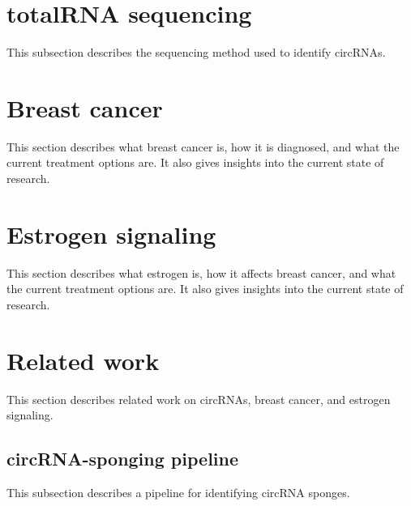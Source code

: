\section{totalRNA sequencing}
This subsection describes the sequencing method used to identify circRNAs.

\lipsum[2]

\section{Breast cancer}
This section describes what breast cancer is, how it is diagnosed, and what the current treatment options are.
It also gives insights into the current state of research.

\lipsum[3]

\section{Estrogen signaling}
This section describes what estrogen is, how it affects breast cancer, and what the current treatment options are.
It also gives insights into the current state of research.

\lipsum[4]

\section{Related work}
This section describes related work on circRNAs, breast cancer, and estrogen signaling.

\subsection{circRNA-sponging pipeline}
This subsection describes a pipeline for identifying circRNA sponges.